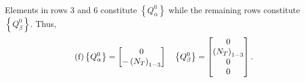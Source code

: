\documentclass{AeroStructure-ERJohnson}
\begin{document}
\begin{example}
\begin{align}
\end{align}
Elements in rows 3 and 6 constitute $\left\{Q_{\alpha}^{0}\right\}$ while the remaining rows constitute $\left\{Q_{\beta}^{0}\right\}$. Thus,
\begin{align}\label{eq16.2f}\tag{f}
\left\{Q_{\alpha}^{0}\right\}=\left[\begin{array}{@{}c@{}}0 \\-\left(N_{T}\right)_{1-3}\end{array}\right] \quad\left\{Q_{\beta}^{0}\right\}=\left[\begin{array}{@{}c@{}}0 \\\left(N_{T}\right)_{1-3} \\0 \\0\end{array}\right].
\end{align}

\vspace*{-1pc}


\end{example}
\end{document}
